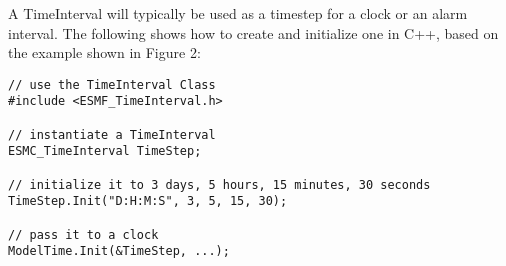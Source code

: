 
A TimeInterval will typically be used as a timestep for a clock or an alarm
interval.  The following shows how to create and initialize one in C++, based
on the example shown in Figure 2:

\begin{verbatim}
// use the TimeInterval Class
#include <ESMF_TimeInterval.h>

// instantiate a TimeInterval
ESMC_TimeInterval TimeStep;

// initialize it to 3 days, 5 hours, 15 minutes, 30 seconds
TimeStep.Init("D:H:M:S", 3, 5, 15, 30);

// pass it to a clock
ModelTime.Init(&TimeStep, ...);
\end{verbatim}
